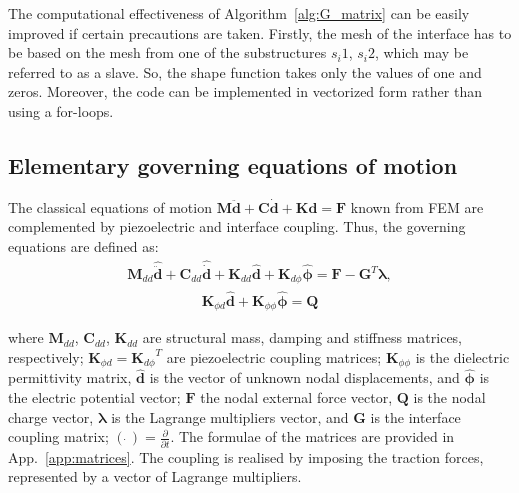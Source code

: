 \documentclass[a4paper,12pt]{article}
\begin{document}
{The computational effectiveness of Algorithm~\ref{alg:G_matrix} can be easily improved if certain precautions are taken.
Firstly, the mesh of the interface has to be based on the mesh from one of the substructures \(s_i1\), \(s_i2\), which may be referred to as a slave.
So, the shape function takes only the values of one and zeros.
Moreover, the code can be implemented in vectorized form rather than using a for-loops.

\subsection{Elementary governing equations of motion}
\label{sec:motion}
The classical equations of motion \(\textbf{M}\ddot{\textbf{d}} + \textbf{C}\dot{\textbf{d}} + \textbf{K}\textbf{d} = \textbf{F}\) known from FEM are complemented by piezoelectric and interface coupling. Thus, the governing equations are defined as:
\begin{eqnarray}
\textbf{M}_{dd} \widehat{\ddot{\textbf{d}}} + \textbf{C}_{dd} \widehat{\dot{\textbf{d}}} + \textbf{K}_{dd} \widehat{\textbf{d}} + \textbf{K}_{d\phi} \widehat{\boldsymbol{\phi}} = \textbf{F} - \textbf{G}^T \boldsymbol{\lambda},
\label{eq:motion}
\end{eqnarray}
\begin{eqnarray}
\textbf{K}_{\phi d}\widehat{\textbf{d}} + \textbf{K}_{\phi \phi} \widehat{\boldsymbol{\phi}} = \textbf{Q}
\label{eq:piezocoupling}
\end{eqnarray} 

where \(\textbf{M}_{dd}\), \(\textbf{C}_{dd}\), \(\textbf{K}_{dd}\) are structural mass, damping and stiffness matrices, respectively; \(\textbf{K}_{\phi d}={\textbf{K}_{d\phi}}^T\) are piezoelectric coupling matrices; \(\textbf{K}_{\phi \phi}\) is the dielectric permittivity matrix, \(\widehat{\textbf{d}}\) is the vector of unknown nodal displacements, and \(\widehat{\boldsymbol{\phi}}\) is the electric potential vector; \(\textbf{F}\) the nodal external force vector, \(\textbf{Q}\) is the nodal charge vector, \(\boldsymbol{\lambda}\) is the Lagrange multipliers vector, and \(\textbf{G}\) is the interface coupling matrix; \((\dot{\ })=\frac{\partial}{\partial t}\).
The formulae of the matrices are provided in App.~\ref{app:matrices}.
The coupling is realised by imposing the traction forces, represented by a vector of Lagrange multipliers. 

}
\end{document}
